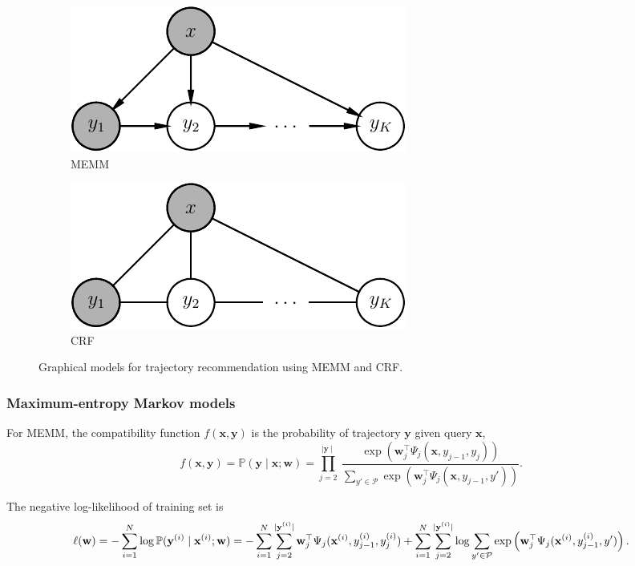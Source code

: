 \documentclass[9pt]{extarticle}
\begin{document}
\begin{figure}
    \centering
    \begin{subfigure}[t]{.49\textwidth} %
        \centering
        \includegraphics[width=.6\textwidth]{memm.pdf} %
        \caption{MEMM}
    \end{subfigure}
    \begin{subfigure}[t]{.49\textwidth}
        \centering
        \includegraphics[width=.6\textwidth]{crf.pdf}
        \caption{CRF}
    \end{subfigure}
    \caption{Graphical models for trajectory recommendation using MEMM and CRF.}
    \label{fig:pgm}
\end{figure}


\subsubsection{Maximum-entropy Markov models}
\label{sec:memm}

For MEMM, the compatibility function $f(\mathbf{x}, \mathbf{y})$ is the probability of trajectory $\mathbf{y}$ given query $\mathbf{x}$,
\begin{equation*}
f(\mathbf{x}, \mathbf{y}) 
= \mathbb{P}(\mathbf{y} \mid \mathbf{x}; \mathbf{w}) 
= \prod_{j=2}^{\mid \mathbf{y} \mid}~
  \frac{\exp \left(\mathbf{w}_j^\top \Psi_j(\mathbf{x}, y_{j-1}, y_j) \right)}
       {\sum_{y' \in \mathcal{P}} \exp \left(\mathbf{w}_j^\top \Psi_j(\mathbf{x}, y_{j-1}, y') \right)}.
\end{equation*}

The negative log-likelihood of training set is
\begin{equation*}
\ell(\mathbf{w}) 
= -\sum_{i=1}^N \log \mathbb{P}(\mathbf{y}^{(i)} \mid \mathbf{x}^{(i)}; \mathbf{w}) \\
= -\sum_{i=1}^N \sum_{j=2}^{\mid \mathbf{y}^{(i)} \mid} 
                \mathbf{w}_j^\top \Psi_j(\mathbf{x}^{(i)}, y_{j-1}^{(i)}, y_j^{(i)}) +
   \sum_{i=1}^N \sum_{j=2}^{\mid \mathbf{y}^{(i)} \mid} 
                \log \sum_{y' \in \mathcal{P}} \exp \left(\mathbf{w}_j^\top \Psi_j(\mathbf{x}^{(i)}, y_{j-1}^{(i)}, y') \right).
\end{equation*}
\end{document}
